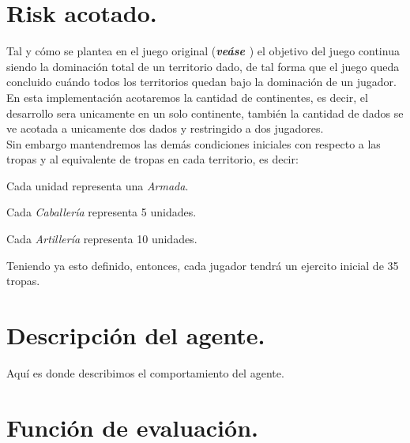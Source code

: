 \documentclass[12pt,twocolumn,draft]{article}
\begin{document}
\section{Risk acotado.}

Tal y c\'omo se plantea en el juego original (\textbf{\textit{ve\'ase \cite{RISK}}}) el objetivo del juego continua siendo la dominaci\'on total de un territorio dado, de tal forma
que el juego queda concluido cu\'ando todos los territorios quedan bajo la dominaci\'on de 
un jugador.\\
En esta implementaci\'on acotaremos la cantidad de continentes, es decir, el desarrollo sera unicamente en un solo continente, tambi\'en la cantidad de dados se ve acotada a unicamente dos dados y restringido a dos jugadores.\\

Sin embargo mantendremos las dem\'as condiciones iniciales con respecto a las tropas y al equivalente de tropas en cada territorio, es decir:
\begin{list}{*}{}
\item Cada unidad representa una \textit{Armada}.
\item Cada \textit{Caballer\'ia} representa 5 unidades.
\item Cada \textit{Artiller\'ia} representa 10 unidades.
\end{list}

Teniendo ya esto definido, entonces, cada jugador tendr\'a un ejercito inicial de 35 tropas.


\section{Descripci\'on del agente.}
Aqu\'i es donde describimos el comportamiento del agente.

\section{Funci\'on de evaluaci\'on.}
\end{document}

